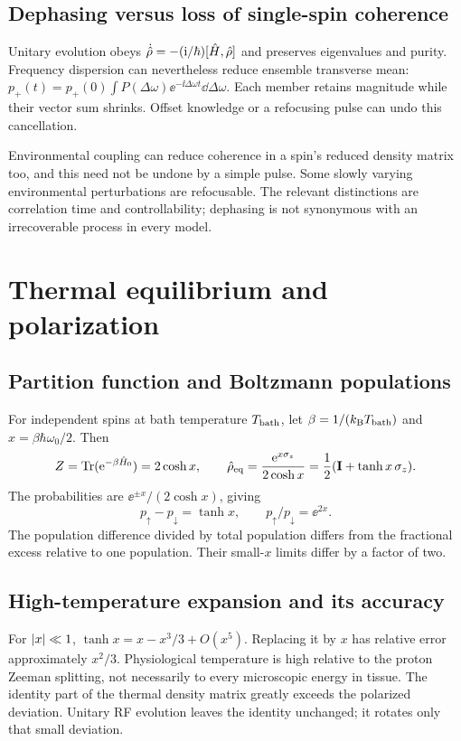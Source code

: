 \subsection{Dephasing versus loss of single-spin coherence}
Unitary evolution obeys
$\dot{\hat{\rho}}=-(\mathrm{i}/\hbar)[\hat{H},\hat{\rho}]$ and preserves eigenvalues
and purity. Frequency dispersion can nevertheless reduce ensemble
transverse mean:
$p_+(t)=p_+(0)\int P(\Delta\omega)\ee^{-\ii\Delta\omega t}\dd\Delta\omega$.
Each member retains magnitude while their vector sum shrinks.
Offset knowledge or a refocusing pulse can undo this cancellation.

Environmental coupling can reduce coherence in a spin's reduced density
matrix too, and this need not be undone by a simple pulse.
Some slowly varying environmental perturbations are refocusable.
The relevant distinctions are correlation time and controllability;
dephasing is not synonymous with an irrecoverable process in every model.

\section{Thermal equilibrium and polarization}
\label{sec:02:thermal-equilibrium-and-polarization}
\subsection{Partition function and Boltzmann populations}
For independent spins at bath temperature $T_{\rm bath}$, let
$\beta=1/(k_{\rm B}T_{\rm bath})$ and $x=\beta\hbar\omega_0/2$.
Then
\[
 Z=\operatorname{Tr}(\mathrm{e}^{-\beta\hat{H}_0})=2\cosh x,\qquad
 \hat{\rho}_{\rm eq}=\frac{\mathrm{e}^{x\sigma_z}}{2\cosh x}
                =\frac12(\mathbf{I}+\tanh x\,\sigma_z).
\]
The probabilities are $\ee^{\pm x}/(2\cosh x)$, giving
\begin{equation}
 p_\uparrow-p_\downarrow=\tanh x,\qquad
 p_\uparrow/p_\downarrow=\ee^{2x}.
 \label{eq:02:boltzmann}
\end{equation}
The population difference divided by total population differs from the
fractional excess relative to one population. Their small-$x$ limits
differ by a factor of two.

\subsection{High-temperature expansion and its accuracy}
For $\lvert x\rvert\ll1$, $\tanh x=x-x^3/3+O(x^5)$.
Replacing it by $x$ has relative error approximately $x^2/3$.
Physiological temperature is high relative to the proton Zeeman splitting,
not necessarily to every microscopic energy in tissue.
The identity part of the thermal density matrix greatly exceeds the
polarized deviation. Unitary RF evolution leaves the identity unchanged;
it rotates only that small deviation.

